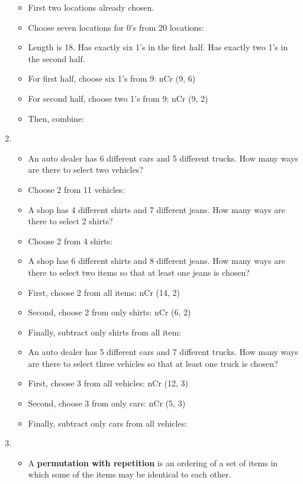 \documentclass[12pt,a4paper]{article}
\begin{document}
\begin{enumerate}
\begin{itemize}
    \item[] First two locations already chosen.
    \item[] Choose seven locations for 0's from 20 locations:   
    \item Length is 18. Has exactly six 1's in the first half. Has exactly two 1's in the second half.
    \item[] For first half, choose six 1's from 9: nCr (9, 6)
    \item[] For second half, choose two 1's from 9: nCr (9, 2)
    \item[] Then, combine:  
  \end{itemize}
  \item {}
  \begin{itemize}
    \item An auto dealer has 6 different cars and 5 different trucks. How many ways are there to select two vehicles?
    \item[] Choose 2 from 11 vehicles:  
    \item A shop has 4 different shirts and 7 different jeans. How many ways are there to select 2 shirts?
    \item[] Choose 2 from 4 shirts:  
    \item A shop has 6 different shirts and 8 different jeans. How many ways are there to select two items so that at least one jeans is chosen?
    \item[] First, choose 2 from all items: nCr (14, 2)
    \item[] Second, choose 2 from only shirts: nCr (6, 2)
    \item[] Finally, subtract only shirts from all item: 
    \item An auto dealer has 5 different cars and 7 different trucks. How many ways are there to select three vehicles so that at least one truck is chosen?
    \item[] First, choose 3 from all vehicles: nCr (12, 3)
    \item[] Second, choose 3 from only cars: nCr (5, 3) 
    \item[] Finally, subtract only cars from all vehicles:  
  \end{itemize}
  \item {}
  \begin{itemize}
    \item A \textbf{permutation with repetition} is an ordering of a set of items in which some of the items may be identical to each other.

\end{itemize}
\end{enumerate}
\end{document}
